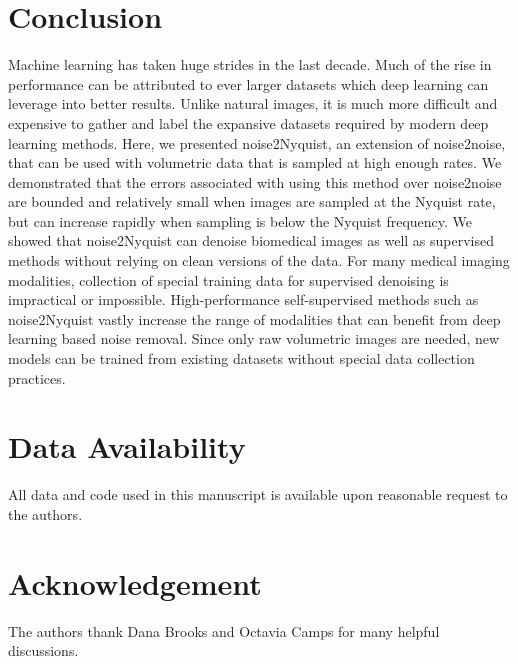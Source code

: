 \documentclass[journal,twoside,web]{ieeecolor}
\begin{document}
\section{Conclusion}
Machine learning has taken huge strides in the last decade. Much of the rise in performance can be attributed to ever larger datasets which deep learning can leverage into better results. Unlike natural images, it is much more difficult and expensive to gather and label the expansive datasets required by modern deep learning methods. Here, we presented noise2Nyquist, an extension of noise2noise, that can be used with volumetric data that is sampled at high enough rates. We demonstrated that the errors associated with using this method over noise2noise are bounded and relatively small when images are sampled at the Nyquist rate, but can increase rapidly when sampling is below the Nyquist frequency. We showed that noise2Nyquist can denoise biomedical images as well as supervised methods without relying on clean versions of the data. For many medical imaging modalities, collection of special training data for supervised denoising is impractical or impossible. High-performance self-supervised methods such as noise2Nyquist vastly increase the range of modalities that can benefit from deep learning based noise removal. Since only raw volumetric images are needed, new models can be trained from existing datasets without special data collection practices.

\section*{Data Availability}
All data and code used in this manuscript is available upon reasonable request to the authors.
\section*{Acknowledgement}
 The authors thank Dana Brooks and Octavia Camps for many helpful discussions.



\end{document}
